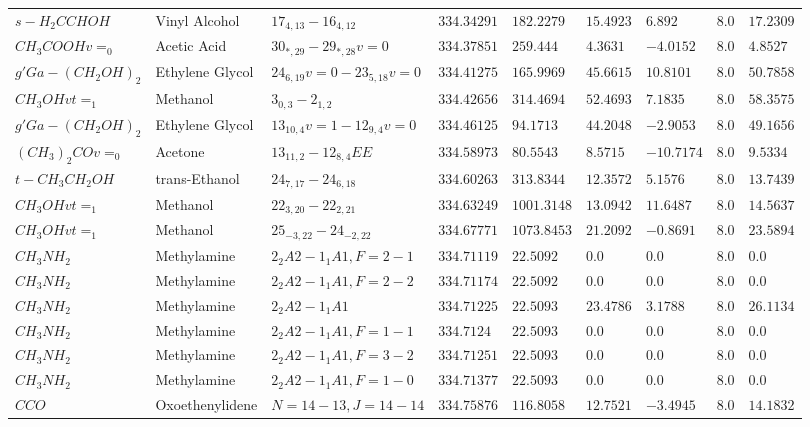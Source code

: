 \documentclass[10pt]{article}
\begin{document}
\begin{landscape}
\begin{table}[htb]
\begin{tabular}{l l l l l l l l l}
$s-H_{2}CCHOH$ & Vinyl Alcohol & $17_{4,13}-16_{4,12}$ & $334.34291$ & $182.2279$ & $15.4923$ & $6.892$ & $8.0$ & $17.2309$\\
$CH_{3}COOHv=_{0}$ & Acetic Acid & $30_{*,29}-29_{*,28}v=0$ & $334.37851$ & $259.444$ & $4.3631$ & $-4.0152$ & $8.0$ & $4.8527$\\
$g'Ga-(CH_{2}OH)_{2}$ & Ethylene Glycol & $24_{6,19}v=0-23_{5,18}v=0$ & $334.41275$ & $165.9969$ & $45.6615$ & $10.8101$ & $8.0$ & $50.7858$\\
$CH_{3}OHvt=_{1}$ & Methanol & $3_{0,3}-2_{1,2}$ & $334.42656$ & $314.4694$ & $52.4693$ & $7.1835$ & $8.0$ & $58.3575$\\
$g'Ga-(CH_{2}OH)_{2}$ & Ethylene Glycol & $13_{10,4}v=1-12_{9,4}v=0$ & $334.46125$ & $94.1713$ & $44.2048$ & $-2.9053$ & $8.0$ & $49.1656$\\
$(CH_{3})_{2}COv=_{0}$ & Acetone & $13_{11,2}-12_{8,4}EE$ & $334.58973$ & $80.5543$ & $8.5715$ & $-10.7174$ & $8.0$ & $9.5334$\\
$t-CH_{3}CH_{2}OH$ & trans-Ethanol & $24_{7,17}-24_{6,18}$ & $334.60263$ & $313.8344$ & $12.3572$ & $5.1576$ & $8.0$ & $13.7439$\\
$CH_{3}OHvt=_{1}$ & Methanol & $22_{3,20}-22_{2,21}$ & $334.63249$ & $1001.3148$ & $13.0942$ & $11.6487$ & $8.0$ & $14.5637$\\
$CH_{3}OHvt=_{1}$ & Methanol & $25_{-3,22}-24_{-2,22}$ & $334.67771$ & $1073.8453$ & $21.2092$ & $-0.8691$ & $8.0$ & $23.5894$\\
$CH_{3}NH_{2}$ & Methylamine & $2_{2}A2-1_{1}A1,F=2-1$ & $334.71119$ & $22.5092$ & $0.0$ & $0.0$ & $8.0$ & $0.0$\\
$CH_{3}NH_{2}$ & Methylamine & $2_{2}A2-1_{1}A1,F=2-2$ & $334.71174$ & $22.5092$ & $0.0$ & $0.0$ & $8.0$ & $0.0$\\
$CH_{3}NH_{2}$ & Methylamine & $2_{2}A2-1_{1}A1$ & $334.71225$ & $22.5093$ & $23.4786$ & $3.1788$ & $8.0$ & $26.1134$\\
$CH_{3}NH_{2}$ & Methylamine & $2_{2}A2-1_{1}A1,F=1-1$ & $334.7124$ & $22.5093$ & $0.0$ & $0.0$ & $8.0$ & $0.0$\\
$CH_{3}NH_{2}$ & Methylamine & $2_{2}A2-1_{1}A1,F=3-2$ & $334.71251$ & $22.5093$ & $0.0$ & $0.0$ & $8.0$ & $0.0$\\
$CH_{3}NH_{2}$ & Methylamine & $2_{2}A2-1_{1}A1,F=1-0$ & $334.71377$ & $22.5093$ & $0.0$ & $0.0$ & $8.0$ & $0.0$\\
$CCO$ & Oxoethenylidene & $N=14-13,J=14-14$ & $334.75876$ & $116.8058$ & $12.7521$ & $-3.4945$ & $8.0$ & $14.1832$\\

\end{tabular}
\end{table}
\end{landscape}
\end{document}
